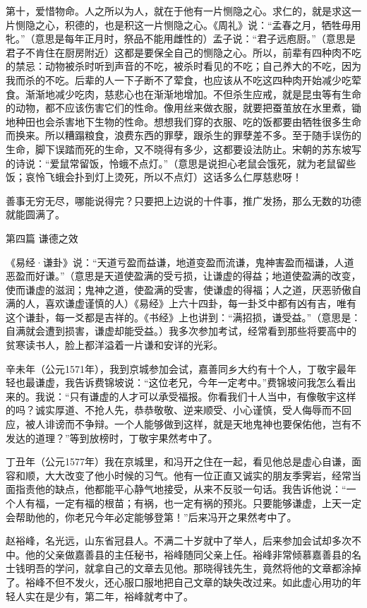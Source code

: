 \documentclass[12pt,UTF8]{ctexbook}
\begin{document}
第十，爱惜物命。人之所以为人，就在于他有一片恻隐之心。求仁的，就是求这一片恻隐之心，积德的，也是积这一片恻隐之心。《周礼》说：“孟春之月，牺牲毋用牝。”（意思是每年正月时，祭品不能用雌性的）孟子说：“君子远庖厨。”（意思是君子不肯住在厨房附近）这都是要保全自己的恻隐之心。所以，前辈有四种肉不吃的禁忌：动物被杀时听到声音的不吃，被杀时看见的不吃；自己养大的不吃，因为我而杀的不吃。后辈的人一下子断不了荤食，也应该从不吃这四种肉开始减少吃荤食。渐渐地减少吃肉，慈悲心也在渐渐地增加。不但杀生应戒，就是昆虫等有生命的动物，都不应该伤害它们的性命。像用丝来做衣服，就要把蚕茧放在水里煮，锄地种田也会杀害地下生物的性命。想想我们穿的衣服、吃的饭都要由牺牲很多生命而换来。所以糟蹋粮食，浪费东西的罪孽，跟杀生的罪孽差不多。至于随手误伤的生命，脚下误踏而死的生命，又不晓得有多少，这都要设法防止。宋朝的苏东坡写的诗说：“爱鼠常留饭，怜蛾不点灯。”（意思是说担心老鼠会饿死，就为老鼠留些饭；哀怜飞蛾会扑到灯上烫死，所以不点灯）这话多么仁厚慈悲呀！

善事无穷无尽，哪能说得完？只要把上边说的十件事，推广发扬，那么无数的功德就能圆满了。


第四篇 谦德之效

《易经·谦卦》说：“天道亏盈而益谦，地道变盈而流谦，鬼神害盈而福谦，人道恶盈而好谦。”（意思是天道使盈满的受亏损，让谦虚的得益；地道使盈满的改变，使而谦虚的滋润；鬼神之道，使盈满的受害，使谦虚的得福；人之道，厌恶骄傲自满的人，喜欢谦虚谨慎的人）《易经》上六十四卦，每一卦爻中都有凶有吉，唯有这个谦卦，每一爻都是吉祥的。《书经》上也讲到：“满招损，谦受益。”（意思是：自满就会遭到损害，谦虚却能受益。）我多次参加考试，经常看到那些将要高中的贫寒读书人，脸上都洋溢着一片谦和安详的光彩。

辛未年（公元1571年），我到京城参加会试，嘉善同乡大约有十个人，丁敬宇最年轻也最谦虚，我告诉费锦坡说：“这位老兄，今年一定考中。”费锦坡问我怎么看出来的。我说：“只有谦虚的人才可以承受福报。你看我们十人当中，有像敬宇这样的吗？诚实厚道、不抢人先，恭恭敬敬、逆来顺受、小心谨慎，受人侮辱而不回应，被人诽谤而不争辩。一个人能够做到这样，就是天地鬼神也要保佑他，岂有不发达的道理？”等到放榜时，丁敬宇果然考中了。

丁丑年（公元1577年）我在京城里，和冯开之住在一起，看见他总是虚心自谦，面容和顺，大大改变了他小时候的习气。他有一位正直又诚实的朋友季霁岩，经常当面指责他的缺点，他都能平心静气地接受，从来不反驳一句话。我告诉他说：“一个人有福，一定有福的根苗；有祸，也一定有祸的预兆。只要能够谦虚，上天一定会帮助他的，你老兄今年必定能够登第！”后来冯开之果然考中了。

赵裕峰，名光远，山东省冠县人。不满二十岁就中了举人，后来参加会试却多次不中。他的父亲做嘉善县的主任秘书，裕峰随同父亲上任。裕峰非常倾慕嘉善县的名士钱明吾的学问，就拿自己的文章去见他。那晓得钱先生，竟然将他的文章都涂掉了。裕峰不但不发火，还心服口服地把自己文章的缺失改过来。如此虚心用功的年轻人实在是少有，第二年，裕峰就考中了。
\end{document}
